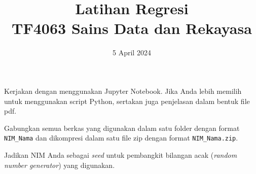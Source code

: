\documentclass[a4paper,11pt]{article} %
\begin{document}
\title{Latihan Regresi \\
TF4063 Sains Data dan Rekayasa}
\author{}
\date{5 April 2024}
\maketitle


Kerjakan dengan menggunakan Jupyter Notebook. Jika Anda lebih memilih untuk menggunakan
script Python, sertakan juga penjelasan dalam bentuk file pdf.

Gabungkan semua berkas yang digunakan dalam satu folder dengan format
\texttt{NIM\_Nama} dan dikompresi dalam satu file zip dengan format
\texttt{NIM\_Nama.zip}.

Jadikan NIM Anda sebagai \textit{seed} untuk pembangkit bilangan acak
(\textit{random number generator}) yang digunakan.
\end{document}
